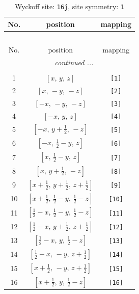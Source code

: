 \documentclass[fleqn,8pt]{jsarticle}
\begin{document}
\begin{longtable}{ccc}
\caption{Wyckoff site: {\tt 16j}, site symmetry: {\tt 1}}
 \\
 \hline \hline
No. & position & mapping \\ \hline \endfirsthead

\multicolumn{2}{l}{\tablename\ \thetable{}} \\
 \hline \hline
No. & position & mapping \\ \hline \endhead

 \hline \hline
\multicolumn{2}{r}{\footnotesize\it continued ...} \\ \endfoot

 \hline \hline
\multicolumn{2}{r}{} \\ \endlastfoot

1 & $\left[ x,\, y,\, z \right]$ & {\tt [1]} \\ \hline
2 & $\left[ x,\, - y,\, - z \right]$ & {\tt [2]} \\ \hline
3 & $\left[ - x,\, - y,\, - z \right]$ & {\tt [3]} \\ \hline
4 & $\left[ - x,\, y,\, z \right]$ & {\tt [4]} \\ \hline
5 & $\left[ - x,\, y + \frac{1}{2},\, - z \right]$ & {\tt [5]} \\ \hline
6 & $\left[ - x,\, \frac{1}{2} - y,\, z \right]$ & {\tt [6]} \\ \hline
7 & $\left[ x,\, \frac{1}{2} - y,\, z \right]$ & {\tt [7]} \\ \hline
8 & $\left[ x,\, y + \frac{1}{2},\, - z \right]$ & {\tt [8]} \\ \hline
9 & $\left[ x + \frac{1}{2},\, y + \frac{1}{2},\, z + \frac{1}{2} \right]$ & {\tt [9]} \\ \hline
10 & $\left[ x + \frac{1}{2},\, \frac{1}{2} - y,\, \frac{1}{2} - z \right]$ & {\tt [10]} \\ \hline
11 & $\left[ \frac{1}{2} - x,\, \frac{1}{2} - y,\, \frac{1}{2} - z \right]$ & {\tt [11]} \\ \hline
12 & $\left[ \frac{1}{2} - x,\, y + \frac{1}{2},\, z + \frac{1}{2} \right]$ & {\tt [12]} \\ \hline
13 & $\left[ \frac{1}{2} - x,\, y,\, \frac{1}{2} - z \right]$ & {\tt [13]} \\ \hline
14 & $\left[ \frac{1}{2} - x,\, - y,\, z + \frac{1}{2} \right]$ & {\tt [14]} \\ \hline
15 & $\left[ x + \frac{1}{2},\, - y,\, z + \frac{1}{2} \right]$ & {\tt [15]} \\ \hline
16 & $\left[ x + \frac{1}{2},\, y,\, \frac{1}{2} - z \right]$ & {\tt [16]} \\
\end{longtable}
\end{document}
